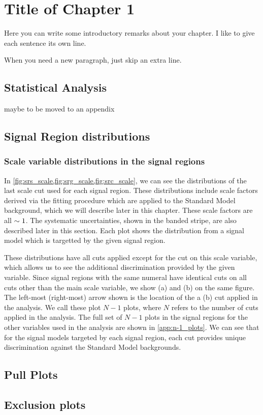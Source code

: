 

\chapter[Results][Top of Page Title]{Title of Chapter 1}

Here you can write some introductory remarks about your chapter.
I like to give each sentence its own line.

When you need a new paragraph, just skip an extra line.

\section{Statistical Analysis}

maybe to be moved to an appendix

\section{Signal Region distributions}

\subsection{Scale variable distributions in the signal regions}

In \ref{fig:srs_scale,fig:srg_scale,fig:src_scale}, we can see the distributions of the last scale cut used for each signal region.
These distributions include scale factors derived via the fitting procedure which are applied to the Standard Model background, which we will describe later in this chapter.
These scale factors are all $\sim 1$.
The systematic uncertainties, shown in the banded stripe, are also described later in this section.
Each plot shows the distribution from a signal model which is targetted by the given signal region.

These distributions have all cuts applied except for the cut on this scale variable, which allows us to see the additional discrimination provided by the given variable.
Since signal regions with the same numeral have identical cuts on all cuts other than the main scale variable, we show (a) and (b) on the same figure.
The left-most (right-most) arrow shown is the location of the a (b) cut applied in the analysis.
We call these plot \textit{$N-1$} plots, where $N$ refers to the number of cuts applied in the analysis.
The full set of $N-1$ plots in the signal regions for the other variables used in the analysis are shown in \ref{app:n-1_plots}.
We can see that for the signal models targeted by each signal region, each cut provides unique discrimination against the Standard Model backgrounds.




\section{Pull Plots}

\section{Exclusion plots}
